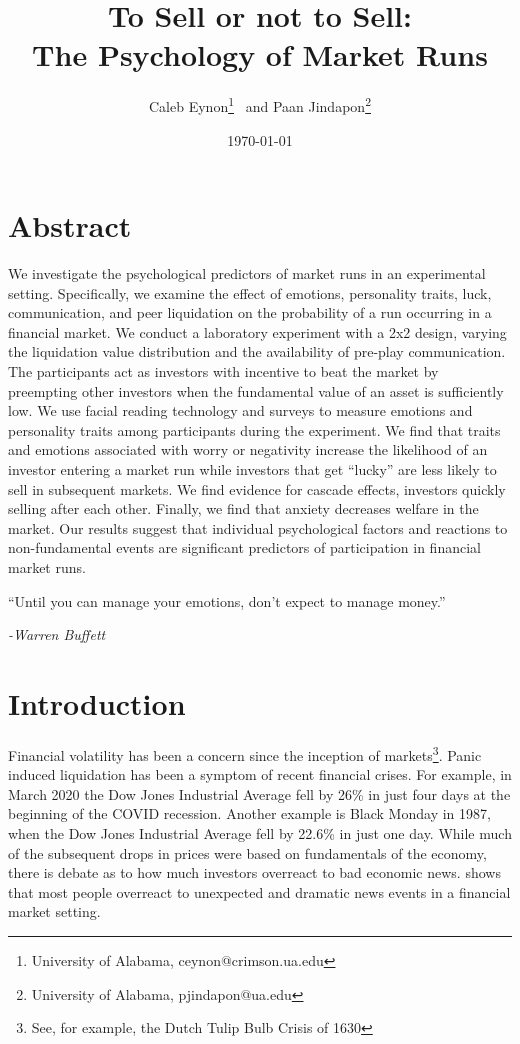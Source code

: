 \documentclass[11pt]{article}
\title{To Sell or not to Sell:\\ The Psychology of Market Runs%
}
\author{Caleb Eynon\thanks{University of Alabama, ceynon@crimson.ua.edu} 
~and  Paan Jindapon\thanks{University of Alabama, pjindapon@ua.edu}  }
\date{\today}
\begin{document}
\maketitle


\section*{\centering\textbf{Abstract}}
\noindent
\begin{singlespace}

\noindent
We investigate the psychological predictors of market runs in an experimental setting. Specifically, we examine the effect of emotions, personality traits, luck, communication, and peer liquidation on the probability of a run occurring in a financial market. We conduct a laboratory experiment with a 2x2 design, varying the liquidation value distribution and the availability of pre-play communication. The participants act as investors with incentive to beat the market by preempting other investors when the fundamental value of an asset is sufficiently low. We use facial reading technology and surveys to measure emotions and personality traits among participants during the experiment. We find that traits and emotions associated with worry or negativity increase the likelihood of an investor entering a market run while investors that get ``lucky'' are less likely to sell in subsequent markets. We find evidence for cascade effects, investors quickly selling after each other. Finally, we find that anxiety decreases welfare in the market. Our results suggest that individual psychological factors and reactions to non-fundamental events are significant predictors of participation in financial market runs. 

\end{singlespace}
\newpage






\epigraph{``Until you can manage your emotions, don’t expect to manage money.''}{\textit{-Warren Buffett}}



\section{Introduction}

Financial volatility has been a concern since the inception of markets\footnote{See, for example, the Dutch Tulip Bulb Crisis of 1630}. Panic induced liquidation has been a symptom of recent financial crises. For example, in March 2020 the Dow Jones Industrial Average fell by 26\% in just four days at the beginning of the COVID recession. Another example is Black Monday in 1987, when the Dow Jones Industrial Average fell by 22.6\% in just one day. While much of the subsequent drops in prices were based on fundamentals of the economy, there is debate as to how much investors overreact to bad economic news. \cite{thaler1985} shows that most people overreact to unexpected and dramatic news events in a financial market setting. 
\end{document}
